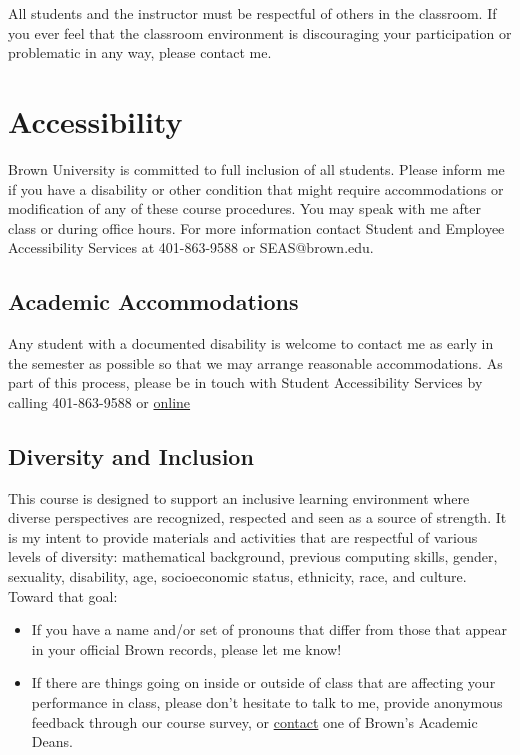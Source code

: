 All students and the instructor must be respectful of others in the classroom. If you ever feel that the classroom environment is discouraging your participation or problematic in any way, please contact me.

\section{Accessibility}
Brown University is committed to full inclusion of all students. Please inform me if you have a disability or other condition that might require accommodations or modification of any of these course procedures. You may speak with me after class or during office hours. For more information contact Student and Employee Accessibility Services at 401-863-9588 or SEAS@brown.edu.

\subsection{Academic Accommodations}
Any student with a documented disability is welcome to contact me as early in the semester as possible so that we may arrange reasonable accommodations. As part of this process, please be in touch with Student Accessibility Services by calling 401-863-9588 or \href{http://brown.edu/Student_Services/Office_of_Student_Life/seas/index.html}{online}

\subsection{Diversity and Inclusion}

This course is designed to support an inclusive learning environment where diverse perspectives are recognized, respected and seen as a source of strength. It is my intent to provide materials and activities that are respectful of various levels of diversity: mathematical background, previous computing skills, gender, sexuality, disability, age, socioeconomic status, ethnicity, race, and culture. Toward that goal:

\begin{itemize}
\item If you have a name and/or set of pronouns that differ from those that appear in your official Brown records, please let me know!
\item If there are things going on inside or outside of class that are affecting your performance in class, please don't hesitate to talk to me, provide anonymous feedback through our course survey, or \href{https://www.brown.edu/academics/college/speak-academic-dean}{contact} one of Brown's Academic Deans.
\end{itemize}
